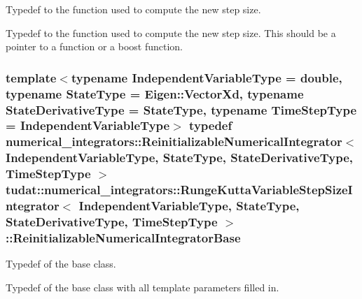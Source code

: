 Typedef to the function used to compute the new step size. 

Typedef to the function used to compute the new step size. This should be a pointer to a function or a boost function. 
\subsubsection[{\texorpdfstring{Reinitializable\+Numerical\+Integrator\+Base}{ReinitializableNumericalIntegratorBase}}]{\setlength{\rightskip}{0pt plus 5cm}template$<$typename Independent\+Variable\+Type  = double, typename State\+Type  = Eigen\+::\+Vector\+Xd, typename State\+Derivative\+Type  = State\+Type, typename Time\+Step\+Type  = Independent\+Variable\+Type$>$ typedef {\bf numerical\+\_\+integrators\+::\+Reinitializable\+Numerical\+Integrator}$<$ Independent\+Variable\+Type, State\+Type, State\+Derivative\+Type, Time\+Step\+Type $>$ {\bf tudat\+::numerical\+\_\+integrators\+::\+Runge\+Kutta\+Variable\+Step\+Size\+Integrator}$<$ Independent\+Variable\+Type, State\+Type, State\+Derivative\+Type, Time\+Step\+Type $>$\+::{\bf Reinitializable\+Numerical\+Integrator\+Base}}\hypertarget{classtudat_1_1numerical__integrators_1_1RungeKuttaVariableStepSizeIntegrator_a0ea5ab73d75b211e5f040d11f3a79fcb}{}\label{classtudat_1_1numerical__integrators_1_1RungeKuttaVariableStepSizeIntegrator_a0ea5ab73d75b211e5f040d11f3a79fcb}


Typedef of the base class. 

Typedef of the base class with all template parameters filled in. 
